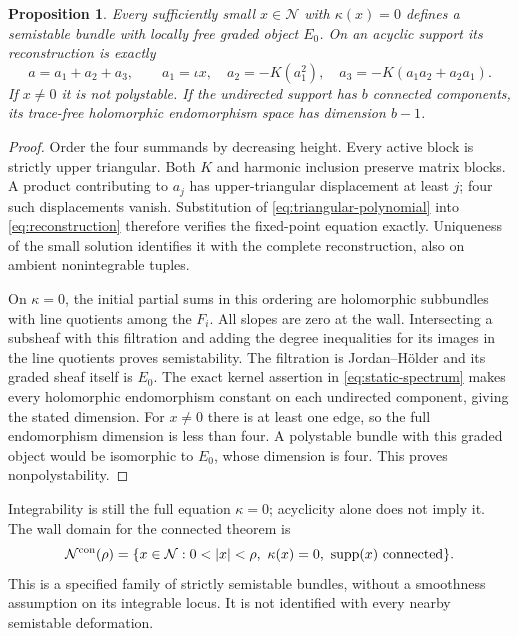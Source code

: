\documentclass[11pt]{amsart}
\newtheorem{proposition}[theorem]{Proposition}
\theoremstyle{definition}
\theoremstyle{remark}
\newcommand{\supp}{\operatorname{supp}}
\begin{document}
\begin{proposition}\label{prop:wall-geometry}
Every sufficiently small $x\in\mathcal N$ with $\kappa(x)=0$
defines a semistable bundle with locally free graded object $E_0$.
On an acyclic support its reconstruction is exactly
\begin{equation}\label{eq:triangular-polynomial}
 a=a_1+a_2+a_3,\qquad
 a_1=\iota x,\quad a_2=-K(a_1^2),\quad
 a_3=-K(a_1a_2+a_2a_1).
\end{equation}
If $x\ne0$ it is not polystable. If the undirected support has
$b$ connected components, its trace-free holomorphic
endomorphism space has dimension $b-1$.
\end{proposition}
\begin{proof}
Order the four summands by decreasing height. Every active
block is strictly upper triangular. Both $K$ and harmonic
inclusion preserve matrix blocks. A product contributing to
$a_j$ has upper-triangular displacement at least $j$; four
such displacements vanish. Substitution of
\eqref{eq:triangular-polynomial} into \eqref{eq:reconstruction}
therefore verifies the fixed-point equation exactly. Uniqueness
of the small solution identifies it with the complete
reconstruction, also on ambient nonintegrable tuples.

On $\kappa=0$, the initial partial sums in this ordering are
holomorphic subbundles with line quotients among the $F_i$.
All slopes are zero at the wall. Intersecting a subsheaf with
this filtration and adding the degree inequalities for its
images in the line quotients proves semistability. The filtration
is Jordan--H\"older and its graded sheaf itself is $E_0$.
The exact kernel assertion in \eqref{eq:static-spectrum} makes
every holomorphic endomorphism constant on each undirected
component, giving the stated dimension. For $x\ne0$ there is
at least one edge, so the full endomorphism dimension is less
than four. A polystable bundle with this graded object would
be isomorphic to $E_0$, whose dimension is four. This proves
nonpolystability.
\end{proof}

Integrability is still the full equation $\kappa=0$;
acyclicity alone does not imply it. The wall domain for the
connected theorem is
\begin{equation}\label{eq:wall-domain}
 \mathcal N^{\rm con}(\rho)=
 \{x\in\mathcal N:0<|x|<\rho,\ \kappa(x)=0,\
                         \supp(x)\text{ connected}\}.
\end{equation}
This is a specified family of strictly semistable bundles,
without a smoothness assumption on its integrable locus.
It is not identified with every nearby semistable deformation.
\end{document}
